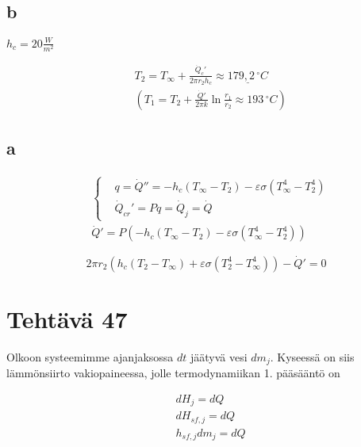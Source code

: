 \documentclass[12pt,a4paper,finnish]{article}
\begin{document}
\subsection{b}

\begin{center}
  \begin{math}
  h_c = 20\frac{W}{m^2}
  \end{math}
\end{center}

\begin{align}
  &T_2 = T_{\infty} + \frac{\dot{Q}_c'}{2\pi r_2 h_c} \approx \underline{179,2\,^{\circ}C}\\
  &\left(T_1 = T_2 + \frac{\dot{Q}'}{2\pi k}\ln \frac{r_1}{r_2} \approx 193\,^{\circ}C\right)
\end{align}

\subsection{a}

\begin{align}
 &\left\{
 \begin{aligned}
  &q = \dot{Q}'' = -h_c(T_{\infty} - T_2) - \varepsilon\sigma(T_{\infty}^4 - T_2^4)\\
  &\dot{Q}_{cr}' = Pq = \dot{Q}_j = \dot{Q}
 \end{aligned}\right.\\
  &\dot{Q}' = P(-h_c(T_{\infty} - T_2) - \varepsilon\sigma(T_{\infty}^4 - T_2^4))
\end{align}

\begin{framed}
 \begin{equation}2\pi r_2(h_c(T_2 - T_{\infty}) + \varepsilon\sigma(T_2^4 - T_{\infty}^4)) - \dot{Q}' = 0
 \end{equation}
\end{framed}

\section{Tehtävä 47}

Olkoon systeemimme ajanjaksossa $dt$ jäätyvä vesi $dm_j$. Kyseessä on siis lämmönsiirto vakiopaineessa, jolle
termodynamiikan 1. pääsääntö on

\begin{align}
 &dH_j = dQ\\
 &dH_{sf, j} = dQ\\
 &h_{sf, j}dm_j = dQ
\end{align}
\end{document}
